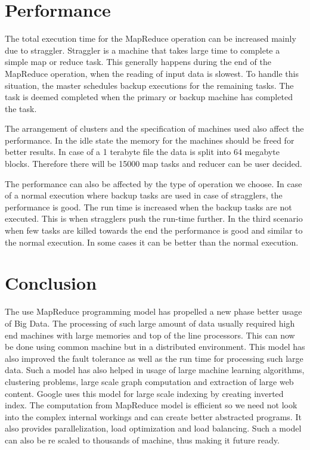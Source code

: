 \documentclass[sigconf]{acmart}
\begin{document}
\section{Performance}
\par The total execution time for the MapReduce operation can be increased mainly due to straggler. Straggler is a machine that takes large time to complete a simple map or reduce task. This generally happens during the end of the MapReduce operation, when the reading of input data is slowest. To handle this situation, the master schedules backup executions for the remaining tasks. The task is deemed completed when the primary or backup machine has completed the task. 
\par  The arrangement of clusters and the specification of machines used also affect the performance. In the idle state the memory for the machines should be freed for better results. In case of a 1 terabyte file the data is split into 64 megabyte blocks. Therefore there will be 15000 map tasks and reducer can be user decided. 
\par The performance can also be affected by the type of operation we choose. In case of a normal execution where backup tasks are used in case of stragglers, the performance is good. The run time is increased when the backup tasks are not executed. This is when stragglers push the run-time further. In the third scenario when few tasks are killed towards the end the performance is good and similar to the normal execution. In some cases it can be better than the normal execution.  
\section{Conclusion}
The use MapReduce programming model has propelled a new phase better usage of Big Data. The processing of such large amount of data usually required high end machines with large memories and top of the line processors. This can now be done using common machine but in a distributed environment. This model has also improved the fault tolerance as well as the run time for processing such large data. Such a model has also helped in usage of large machine learning algorithms, clustering problems, large scale graph computation and extraction of large web content. Google uses this model for large scale indexing by creating inverted index. The computation from MapReduce model is efficient so we need not look into the complex internal workings and can create better abstracted programs. It also provides parallelization, load optimization and load balancing. Such a model can also be re scaled to thousands of machine, thus making it future ready. 
\end{document}
